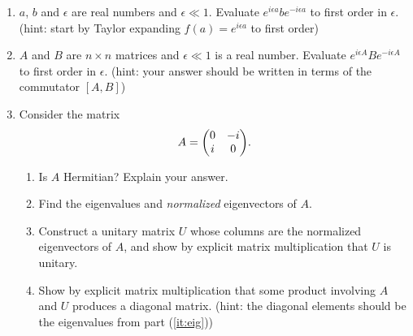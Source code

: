 \documentclass{article}
\begin{document}
\pagestyle{fancy}
\fancyhf{}
\rfoot{\thepage}
\renewcommand{\headrulewidth}{0pt}
\begin{enumerate}
    \item $a$, $b$ and $\epsilon$ are real numbers and $\epsilon \ll 1$.  Evaluate $e^{i\epsilon a} b e^{-i\epsilon a}$ to first order in $\epsilon$. (hint: start by Taylor expanding $f(a) = e^{i\epsilon a}$ to first order)
    \vspace{8cm}
    \item $A$ and $B$ are $n\times n$ matrices and $\epsilon\ll 1$ is a real number.  Evaluate $e^{i\epsilon A} B e^{-i\epsilon A}$ to first order in $\epsilon$. (hint: your answer should be written in terms of the commutator $[A,B]$)
    \newpage
    \item Consider the matrix
    \begin{equation}
        A = \mqty(0&-i\\i&0).
    \end{equation}
    \begin{enumerate}
        \item Is $A$ Hermitian?  Explain your answer.
        \vspace{2cm}
        \item\label{it:eig} Find the eigenvalues and \textit{normalized} eigenvectors of $A$.
        \vspace{6cm}
        \item Construct a unitary matrix $U$ whose columns are the normalized eigenvectors of $A$, and show by explicit matrix multiplication that $U$ is unitary.
        \vspace{4cm}
        \item Show by explicit matrix multiplication that some product involving $A$ and $U$ produces a diagonal matrix. (hint: the diagonal elements should be the eigenvalues from part (\ref{it:eig}))
    \end{enumerate}
\end{enumerate}
\end{document}
